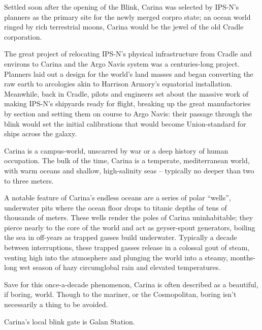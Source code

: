 Settled soon after the opening of the Blink, Carina was selected by IPS-N’s planners as the
primary site for the newly merged corpro state; an ocean world ringed by rich terrestrial moons,
Carina would be the jewel of the old Cradle corporation.

The great project of relocating IPS-N’s physical infrastructure from Cradle and environs to Carina
and the Argo Navis system was a centuries-long project. Planners laid out a design for the world’s
land masses and began converting the raw earth to arcologies akin to Harrison Armory’s
equatorial installation. Meanwhile, back in Cradle, pilots and engineers set about the massive
work of making IPS-N’s shipyards ready for flight, breaking up the great manufactories by section
and setting them on course to Argo Navis: their passage through the blink would set the initial
calibrations that would become Union-standard for ships across the galaxy.

Carina is a campus-world, unscarred by war or a deep history of human occupation. The bulk of
the time, Carina is a temperate, mediterranean world, with warm oceans and shallow, high-salinity
seas -- typically no deeper than two to three meters.

A notable feature of Carina’s endless oceans are a series of polar “wells”, underwater pits where
the ocean floor drops to titanic depths of tens of thousands of meters. These wells render the
poles of Carina uninhabitable; they pierce nearly to the core of the world and act as geyser-spout
generators, boiling the sea in off-years as trapped gasses build underwater. Typically a decade
between interruptions, these trapped gasses release in a colossal gout of steam, venting high into
the atmosphere and plunging the world into a steamy, months-long wet season of hazy
circumglobal rain and elevated temperatures.

Save for this once-a-decade phenomenon, Carina is often described as a beautiful, if boring,
world. Though to the mariner, or the Cosmopolitan, boring isn’t necessarily a thing to be avoided.

Carina’s local blink gate is Galan Station.